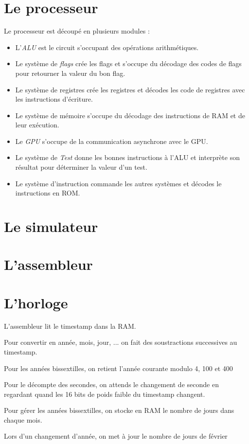 \documentclass{article}
\begin{document}
\section{Le processeur}
Le processeur est découpé en plusieurs modules :\begin{itemize}
    \item L'\emph{ALU} est le circuit s'occupant des opérations arithmétiques.
    \item Le système de \emph{flags} crée les flags et s'occupe du décodage
        des codes de flags pour retourner la valeur du bon flag.
    \item Le système de registres crée les registres et décodes les code de
        registres avec les instructions d'écriture.
    \item Le système de mémoire s'occupe du décodage des instructions de RAM
        et de leur exécution.
    \item Le \emph{GPU} s'occupe de la communication asynchrone avec le GPU.
    \item Le système de \emph{Test} donne les bonnes instructions à l'ALU et
        interprète son résultat pour déterminer la valeur d'un test.
    \item Le système d'instruction commande les autres systèmes et décodes le
        instructions en ROM.
\end{itemize}

\section{Le simulateur}

\section{L'assembleur}

\section{L'horloge}
L'assembleur lit le timestamp dans la RAM.

Pour convertir en année, mois, jour, ... on fait des soustractions
successives au timestamp.

Pour les années bissextilles, on retient l'année courante modulo 4, 100 et
400

Pour le décompte des secondes, on attends le changement de seconde en
regardant quand les 16 bits de poids faible du timestamp changent.

Pour gérer les années bissextilles, on stocke en RAM le nombre de jours
dans chaque mois.

Lors d'un changement d'année, on met à jour le nombre de jours de février
\end{document}
